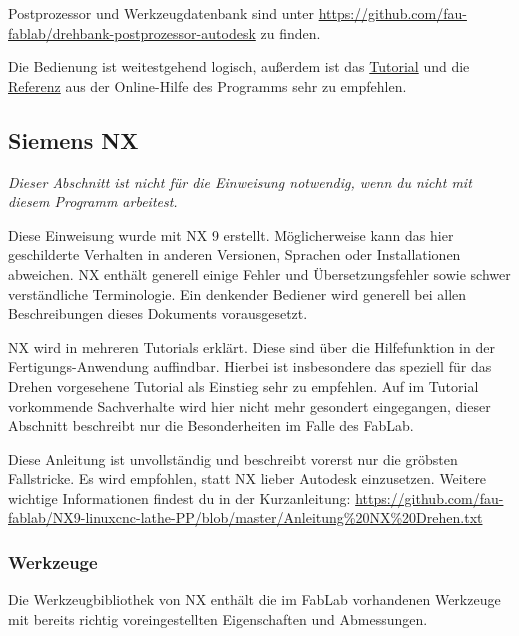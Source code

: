 \documentclass{\basedir/fablab-document}
\begin{document}
Postprozessor und Werkzeugdatenbank sind unter \url{https://github.com/fau-fablab/drehbank-postprozessor-autodesk} zu finden.

Die Bedienung ist weitestgehend logisch, außerdem ist das \href{http://help.autodesk.com/view/INVHSM/2016/DEU/?guid=GUID-56A84DA8-46DB-458A-91FD-41791CE6FABA}{Tutorial} und die \href{http://help.autodesk.com/view/INVHSM/2016/DEU/?guid=GUID-7B7A2457-8EE9-4AE0-839B-6271340A396C}{Referenz} aus der Online-Hilfe des Programms sehr zu empfehlen.

\subsection{Siemens NX}
\emph{Dieser Abschnitt ist nicht für die Einweisung notwendig, wenn du nicht mit diesem Programm arbeitest.}

Diese Einweisung wurde mit NX 9 erstellt. Möglicherweise kann das hier geschilderte Verhalten in anderen Versionen, Sprachen oder Installationen abweichen. NX enthält generell einige Fehler und Übersetzungsfehler sowie schwer verständliche Terminologie. Ein denkender Bediener wird generell bei allen Beschreibungen dieses Dokuments vorausgesetzt.

NX wird in mehreren Tutorials erklärt. Diese sind über die Hilfefunktion in der Fertigungs-Anwendung auffindbar. Hierbei ist insbesondere das speziell für das Drehen vorgesehene Tutorial als Einstieg sehr zu empfehlen. Auf im Tutorial vorkommende Sachverhalte wird hier nicht mehr gesondert eingegangen, dieser Abschnitt beschreibt nur die Besonderheiten im Falle des FabLab.

Diese Anleitung ist unvollständig und beschreibt vorerst nur die gröbsten Fallstricke. Es wird empfohlen, statt NX lieber Autodesk einzusetzen. Weitere wichtige Informationen findest du in der Kurzanleitung: \url{https://github.com/fau-fablab/NX9-linuxcnc-lathe-PP/blob/master/Anleitung%20NX%20Drehen.txt}

\subsubsection{Werkzeuge}
Die Werkzeugbibliothek von NX enthält die im FabLab vorhandenen Werkzeuge mit bereits richtig voreingestellten Eigenschaften und Abmessungen. 
\end{document}
